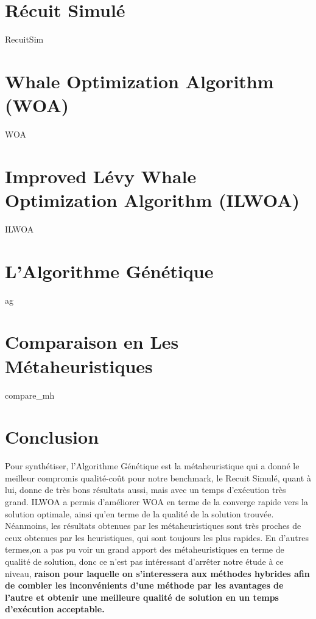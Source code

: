 \documentclass[12pt,a4paper, titlepage]{report}
\begin{document}
    \section{Récuit Simulé }
    {RecuitSim}
    \section{Whale Optimization Algorithm (WOA)}
    {WOA}
    \section{Improved Lévy Whale Optimization Algorithm (ILWOA)}
    {ILWOA}
    \section{L'Algorithme Génétique}
    {ag}
    \section{Comparaison en Les Métaheuristiques}
    {compare_mh}
    \section{Conclusion}
    Pour synthétiser, l’Algorithme Génétique est la métaheuristique qui a donné le meilleur compromis qualité-coût pour notre benchmark, le Recuit Simulé, quant à lui, donne de très bons résultats aussi, mais avec un temps d'exécution très grand. ILWOA a permis d’améliorer WOA en terme de la converge rapide vers la solution optimale, ainsi qu’en terme de la qualité de la solution trouvée. Néanmoins, les résultats obtenues par les métaheuristiques sont très proches de ceux obtenues par les heuristiques, qui sont toujours les plus rapides. En d’autres termes,on a pas pu voir un grand apport des métaheuristiques en terme de qualité de solution, donc ce n’est pas intéressant d’arrêter notre étude à ce niveau, \textbf{raison pour laquelle on s’interessera aux méthodes hybrides afin de combler les inconvénients d’une méthode par les avantages de l’autre et obtenir une meilleure qualité de solution en un temps d'exécution acceptable.}
\end{document}
